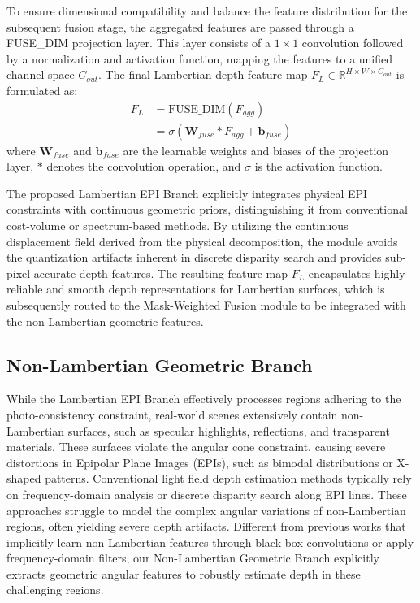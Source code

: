 \documentclass[lettersize,journal]{IEEEtran}
\begin{document}
To ensure dimensional compatibility and balance the feature distribution for the subsequent fusion stage, the aggregated features are passed through a FUSE\_DIM projection layer. This layer consists of a $1 \times 1$ convolution followed by a normalization and activation function, mapping the features to a unified channel space $C_{out}$. The final Lambertian depth feature map $F_L \in \mathbb{R}^{H \times W \times C_{out}}$ is formulated as:
\begin{equation}
\begin{aligned}
F_L &= \text{FUSE\_DIM}(F_{agg}) \\
&= \sigma(\mathbf{W}_{fuse} * F_{agg} + \mathbf{b}_{fuse})
\end{aligned}
\end{equation}
where $\mathbf{W}_{fuse}$ and $\mathbf{b}_{fuse}$ are the learnable weights and biases of the projection layer, $*$ denotes the convolution operation, and $\sigma$ is the activation function.

The proposed Lambertian EPI Branch explicitly integrates physical EPI constraints with continuous geometric priors, distinguishing it from conventional cost-volume or spectrum-based methods. By utilizing the continuous displacement field derived from the physical decomposition, the module avoids the quantization artifacts inherent in discrete disparity search and provides sub-pixel accurate depth features. The resulting feature map $F_L$ encapsulates highly reliable and smooth depth representations for Lambertian surfaces, which is subsequently routed to the Mask-Weighted Fusion module to be integrated with the non-Lambertian geometric features.

\subsection{Non-Lambertian Geometric Branch}

While the Lambertian EPI Branch effectively processes regions adhering to the photo-consistency constraint, real-world scenes extensively contain non-Lambertian surfaces, such as specular highlights, reflections, and transparent materials. These surfaces violate the angular cone constraint, causing severe distortions in Epipolar Plane Images (EPIs), such as bimodal distributions or X-shaped patterns. Conventional light field depth estimation methods typically rely on frequency-domain analysis or discrete disparity search along EPI lines. These approaches struggle to model the complex angular variations of non-Lambertian regions, often yielding severe depth artifacts. Different from previous works that implicitly learn non-Lambertian features through black-box convolutions or apply frequency-domain filters, our Non-Lambertian Geometric Branch explicitly extracts geometric angular features to robustly estimate depth in these challenging regions.
\end{document}
